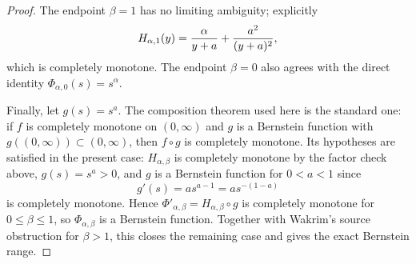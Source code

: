 \begin{proof}
The endpoint \(\beta=1\) has no limiting ambiguity; explicitly
\[
 H_{\alpha,1}(y)
 ={\alpha\over y+a}+{a^2\over (y+a)^2},
\]
which is completely monotone.  The endpoint \(\beta=0\) also agrees with the
direct identity \(\Phi_{\alpha,0}(s)=s^\alpha\).

Finally, let \(g(s)=s^a\).  The composition theorem used here is the standard
one: if \(f\) is completely monotone on \((0,\infty)\) and \(g\) is a
Bernstein function with \(g((0,\infty))\subset(0,\infty)\), then \(f\circ g\)
is completely monotone.  Its hypotheses are satisfied in the present case:
\(H_{\alpha,\beta}\) is completely monotone by the factor check above,
\(g(s)=s^a>0\), and \(g\) is a Bernstein function for \(0<a<1\) since
\[
  g'(s)=a s^{a-1}=a s^{-(1-a)}
\]
is completely monotone.  Hence
\(\Phi'_{\alpha,\beta}=H_{\alpha,\beta}\circ g\) is completely monotone for
\(0\le\beta\le1\), so \(\Phi_{\alpha,\beta}\) is a Bernstein function.
Together with Wakrim's source obstruction for \(\beta>1\), this closes the
remaining case and gives the exact Bernstein range.
\end{proof}


